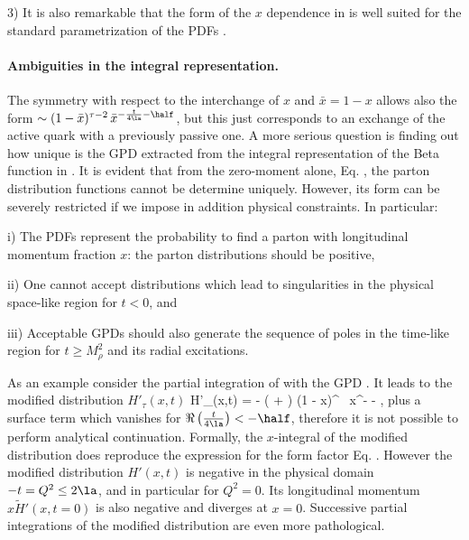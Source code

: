 \documentclass[aps,prd,preprint,groupedaddress]{revtex4-1}
\begin{document}
3) It is also  remarkable  that the form of the $x$ dependence in  is well suited for the standard parametrization of the PDFs \cite{Aaron:2009aa, Abramowicz:2015mha}.


\paragraph{Ambiguities in the integral representation.} The symmetry with respect to the interchange of $x$ and $\bar x = 1-x$ allows also the form $\sim (1 - \bar x)^{\tau -2} \, {\bar x} ^{-\frac{t}{4\la} - \half}$, but this just corresponds to an exchange of the active quark with a previously passive one. A more serious question is finding out how unique is the GPD extracted from the integral representation of the Beta function in . It is evident that from the zero-moment alone, Eq. , the parton distribution functions cannot be determine uniquely. However, its form can be severely restricted if we impose in addition physical constraints. In particular: 

i) The PDFs represent the probability to find a parton with longitudinal momentum fraction $x$: the parton distributions should be positive,

 ii) One cannot accept distributions which lead to singularities in the physical space-like region for $t<0$, and  
 
 iii) Acceptable GPDs should also generate the sequence of poles in the time-like region for $t \ge M_\rho^2$ and its radial excitations.

As an example consider the partial integration of   with the GPD . It leads to the modified distribution $H'_\tau(x,t)$ 
\beq {}
H'_\tau(x,t)  = -   \left( + \half\right)  (1 - x)^{} \, x^{- - },
\enq
plus a surface term which vanishes for $\Re \left(\frac{t}{4 \la}\right) < -\half$,  therefore it is not possible to perform  analytical continuation.  Formally, the $x$-integral of the modified distribution  does reproduce the expression for the form factor Eq. . However the modified distribution  $H'(x,t)$ is negative in the physical domain  $- t = Q^2 \le 2 \la$, and in particular for $Q^2 = 0$.  Its longitudinal momentum $x \tilde H'(x, t =0)$ is also negative and diverges at $x = 0$.  Successive partial integrations of the modified distribution  are even more pathological.
 
\end{document}
